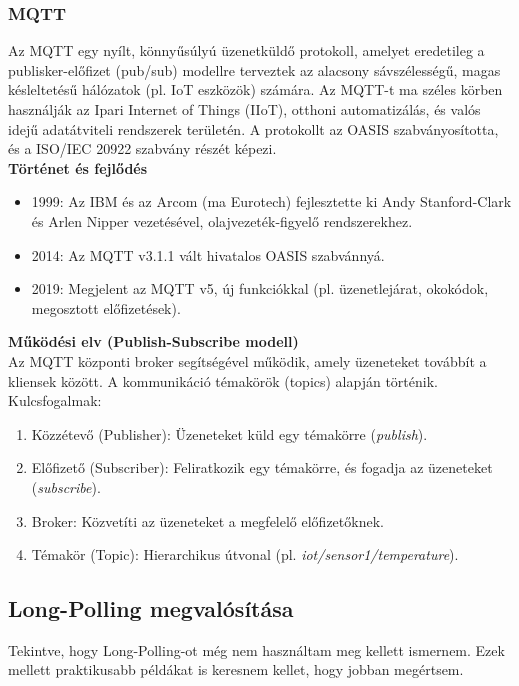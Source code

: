 \documentclass{thesis-ekf}
\theoremstyle{definition}
\theoremstyle{remark}
\begin{document}
	\subsubsection{MQTT}
	\label{sssec_MQQTT}
	Az MQTT egy nyílt, könnyűsúlyú üzenetküldő protokoll, amelyet eredetileg a publisker-előfizet (pub/sub) modellre terveztek az alacsony sávszélességű, magas késleltetésű hálózatok (pl. IoT eszközök) számára. Az MQTT-t ma széles körben használják az Ipari Internet of Things (IIoT), otthoni automatizálás, és valós idejű adatátviteli rendszerek területén. A protokollt az OASIS szabványosította, és a ISO/IEC 20922 szabvány részét képezi\cite{bib_MQTT_iso,bib_MQTT_oasis}.\\
	\textbf{Történet és fejlődés}
	\begin{itemize}
		\item 1999: Az IBM és az Arcom (ma Eurotech) fejlesztette ki Andy Stanford-Clark és Arlen Nipper vezetésével, olajvezeték-figyelő rendszerekhez\cite{bib_MQTT_ibm}.
		\item 2014: Az MQTT v3.1.1 vált hivatalos OASIS szabvánnyá.
		\item 2019: Megjelent az MQTT v5, új funkciókkal (pl. üzenetlejárat, okokódok, megosztott előfizetések).
	\end{itemize}
	\textbf{Működési elv (Publish-Subscribe modell)}\\
	Az MQTT központi broker segítségével működik, amely üzeneteket továbbít a kliensek között. A kommunikáció témakörök (topics) alapján történik.
	Kulcsfogalmak:
	\begin{enumerate}
		\item Közzétevő (Publisher): Üzeneteket küld egy témakörre (\textit{publish}).
		\item Előfizető (Subscriber): Feliratkozik egy témakörre, és fogadja az üzeneteket (\textit{subscribe}).
		\item Broker: Közvetíti az üzeneteket a megfelelő előfizetőknek.
		\item Témakör (Topic): Hierarchikus útvonal (pl. \textit{iot/sensor1/temperature}).
	\end{enumerate}
	\subsection{Long-Polling megvalósítása}
	\label{ssec_long_polling}
	Tekintve, hogy Long-Polling-ot még nem használtam meg kellett ismernem\cite{bib_long_poll1,bib_long_poll_imp}. Ezek mellett praktikusabb példákat is keresnem kellet, hogy jobban megértsem\cite{bib_long_poll_pl}.
	
\end{document}
